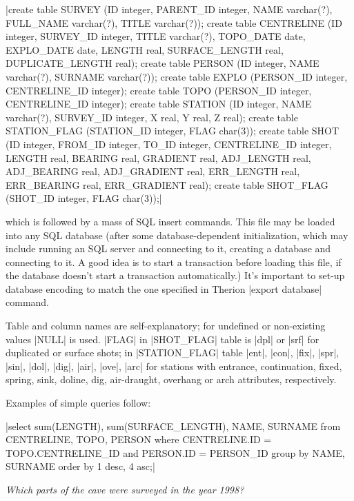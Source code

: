 |create table SURVEY (ID integer, PARENT_ID integer,
  NAME varchar(?), FULL_NAME varchar(?), TITLE varchar(?));
create table CENTRELINE (ID integer, SURVEY_ID integer,
  TITLE varchar(?), TOPO_DATE date, EXPLO_DATE date,
  LENGTH real, SURFACE_LENGTH real, DUPLICATE_LENGTH real);
create table PERSON (ID integer, NAME varchar(?), SURNAME varchar(?));
create table EXPLO (PERSON_ID integer, CENTRELINE_ID integer);
create table TOPO (PERSON_ID integer, CENTRELINE_ID integer);
create table STATION (ID integer, NAME varchar(?),
  SURVEY_ID integer, X real, Y real, Z real);
create table STATION_FLAG (STATION_ID integer, FLAG char(3));
create table SHOT (ID integer, FROM_ID integer, TO_ID integer,
  CENTRELINE_ID integer, LENGTH real, BEARING real, GRADIENT real,
  ADJ_LENGTH real, ADJ_BEARING real, ADJ_GRADIENT real,
  ERR_LENGTH real, ERR_BEARING real, ERR_GRADIENT real);
create table SHOT_FLAG (SHOT_ID integer, FLAG char(3));|

which is followed by a mass of SQL insert commands. This file may be loaded
into any SQL database (after some database-dependent initialization, which may
include running an SQL server and connecting to it, creating a database and
connecting to it. A good idea is to start a transaction before loading this
file, if the database doesn't start a transaction automatically.)
It's important to set-up database encoding to match the one
specified in Therion |export database| command.

\iffulloutput
\midinsert
    \centerline{}%
\endinsert
\fi

Table and column names are self-explanatory; for undefined or non-existing
values |NULL| is used. |FLAG| in |SHOT_FLAG| table is |dpl| or |srf| for duplicated
or surface shots; in |STATION_FLAG| table |ent|, |con|, |fix|,
|spr|, |sin|, |dol|, |dig|, |air|, |ove|, |arc| for stations
with entrance, continuation, fixed, spring, sink, doline, dig, air-draught,
overhang or arch attributes, respectively.

Examples of simple queries follow:


|select sum(LENGTH), sum(SURFACE_LENGTH), NAME, SURNAME
  from CENTRELINE, TOPO, PERSON
  where CENTRELINE.ID = TOPO.CENTRELINE_ID and PERSON.ID = PERSON_ID
  group by NAME, SURNAME order by 1 desc, 4 asc;|

{\it Which parts of the cave were surveyed in the year 1998?}

